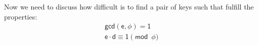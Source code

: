 \documentclass{article}
\begin{document}
\par \noindent Now we need to discuss how difficult is to find a pair of keys such that fulfill the properties:
\begin{align*}
    \mathsf{gcd(e, \phi) = 1} \\
    \mathsf{e \cdot d \equiv 1 \pmod{\phi}}
\end{align*}

\end{document}
